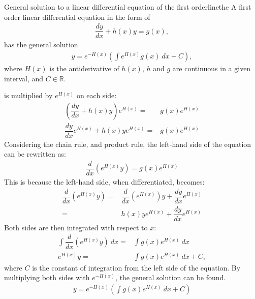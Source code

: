 \begin{theorem}{General solution to a linear differential equation of the first order}{linethe}
A first order linear differential equation in the form of
\begin{align} \label{FODE_form}
\dfrac{dy}{dx}+h(x)y=g(x),
\end{align}
has the general solution
\begin{align} \label{FODE_solution}
y=e^{-H(x)}\left(\int e^{H(x)}g(x)\ dx+C\right),
\end{align}
where $H(x)$ is the antiderivative of $h(x)$, $h$ and $g$ are continuous in a given interval, and $C\in \mathbb{R}$.
\end{theorem}

\begin{prof}{}{}
 is multiplied by $e^{H(x)}$ on each side:
\begin{align*}
\left(\dfrac{dy}{dx}+h(x)y\right)e^{H(x)}=&g(x)e^{H(x)}
\\
\dfrac{dy}{dx}e^{H(x)}+h(x)ye^{H(x)}=&g(x)e^{H(x)}
\end{align*}
Considering the chain rule, and product rule, the left-hand side of the equation can be rewritten as:
\begin{align*}
\dfrac{d}{dx}\left(e^{H(x)}y\right)=g(x)e^{H(x)}
\end{align*}
This is because the left-hand side, when differentiated, becomes:
\begin{align*}
\dfrac{d}{dx}\left(e^{H(x)}y\right)=&\dfrac{d}{dx}\left(e^{H(x)}\right)y+\dfrac{dy}{dx}e^{H(x)} \\
 =& h(x)ye^{H(x)}+\dfrac{dy}{dx}e^{H(x)}
\end{align*}
Both sides are then integrated with respect to $x$:
\begin{align*}
\int\dfrac{d}{dx}\left(e^{H(x)}y\right)\ dx=&\int g(x)e^{H(x)}\ dx
\\
e^{H(x)}y=&\int g(x)e^{H(x)}\ dx+C,
\end{align*}
where $C$ is the constant of integration from the left side of the  equation. By multiplying both sides with $e^{-H(x)}$, the general solution can be found.
\begin{align}
y=e^{-H(x)}\left(\int g(x)e^{H(x)}\ dx+C\right)
\end{align}
\end{prof}

